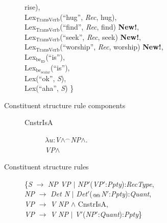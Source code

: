 \begin{description}
\begin{tabbing}
rise), \\
\> Lex$_{\mathrm{TransVerb}}$(``hug'', \textit{Rec}, hug), \\
\> Lex$_{\mathrm{TransVerb}}$(``find'', \textit{Rec}, find)
\textbf{New!}, \\
\> Lex$_{\mathrm{TransVerb}}$(``seek'', \textit{Rec}, seek)
\textbf{New!}, \\
\> Lex$_{\mathrm{TransVerb}}$(``worship'', \textit{Rec}, worship) \textbf{New!}, \\
\> Lex$_{\mathrm{be}_{\text{ID}}}$(``is''), \\
\> Lex$_{\mathrm{be}_{\text{scalar}}}$(``is''), \\
\> Lex(``ok'', \textit{S}),  \\
\> Lex(``aha'', \textit{S})  \}
\end{tabbing}

\item[Constituent structure rule components] \mbox{} 
  \begin{description}

    \item[\textnormal{CnstrIsA}] \mbox{}

  $\lambda
u$:\textit{V}\d{$\wedge$}$^{\frown}$\textit{NP}\d{$\wedge$}. \\
\hspace*{1em} \textit{VP}\d{$\wedge$} 

  \end{description}
  


\item[Constituent structure rules] \mbox{}
  
  \begin{tabbing}
    \{\=\textit{S} $\longrightarrow$ \textit{NP VP} $\mid$ \textit{NP}$'$(\textit{VP}$'$:\textit{Ppty}):\textit{RecType},\\
    \>\textit{NP} $\longrightarrow$ \textit{Det N} $\mid$
    \textit{Det}$'$($_{\text{@\!@}}$\textit{N}$'$:\textit{Ppty}):\textit{Quant},\\
    \>\textit{VP} $\longrightarrow$ \textit{V} \textit{NP}
    \d{\d{$\wedge$}} CnstrIsA, \\
    \>\textit{VP} $\longrightarrow$ \textit{V} \textit{NP} $\mid$
    \textit{V}$'$(\textit{NP}$'$:\textit{Quant}):\textit{Ppty}\}

  \end{tabbing}

\end{description}




